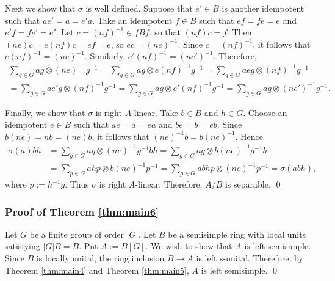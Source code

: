 \documentclass[12pt]{amsart}
\theoremstyle{definition}
\begin{document}
Next we show that $\sigma$ is well defined.
Suppose that $e' \in B$ is another idempotent such that $ae'=a=e'a$.
Take an idempotent $f \in B$ such that
$ef=fe=e$ and $e'f=fe'=e'$.
Let $c=(nf)^{-1}\in fBf$, so that
$(nf)c=f$. Then
$(ne)c=e(nf)c=ef=e$, so
$ec=(ne)^{-1}$.
Since $c=(nf)^{-1}$, it follows that
$e(nf)^{-1}=(ne)^{-1}$.
Similarly, $e'(nf)^{-1}=(ne')^{-1}$.
Therefore,
\[
\begin{array}{l}
\displaystyle
\sum_{g \in G} ag \otimes (ne)^{-1}g^{-1}
=
\sum_{g \in G} ag \otimes e(nf)^{-1}g^{-1}
=
\sum_{g \in G} aeg \otimes (nf)^{-1}g^{-1}
\\[10pt]
\displaystyle
=
\sum_{g \in G} ae'g \otimes (nf)^{-1}g^{-1}
=
\sum_{g \in G} ag \otimes e'(nf)^{-1}g^{-1}
=
\sum_{g \in G} ag \otimes (ne')^{-1}g^{-1}.
\end{array}
\]

Finally, we show that $\sigma$ is right $A$-linear.
Take $b \in B$ and $h \in G$.
Choose an idempotent $e \in B$ such that
$ae=a=ea$ and $be=b=eb$. Since
$b(ne)=nb=(ne)b$, it follows that
$(ne)^{-1}b=b(ne)^{-1}$. Hence
\[
\begin{aligned}
\sigma(a)bh
&=
\sum_{g\in G} ag \otimes (ne)^{-1}g^{-1}bh 
=
\sum_{g\in G} ag \otimes b(ne)^{-1}g^{-1}h \\
&=
\sum_{p\in G} ahp \otimes b(ne)^{-1}p^{-1} 
=
\sum_{p\in G} abhp \otimes (ne)^{-1}p^{-1} 
=
\sigma(abh),
\end{aligned}
\]
where $p := h^{-1}g$.
Thus $\sigma$ is right $A$-linear.
Therefore, $A/B$ is separable.
\qed

\subsubsection*{Proof of Theorem \ref{thm:main6}}
Let $G$ be a finite group 
of order $|G|$.
Let $B$ be a semisimple ring with local units 
satisfying $|G|B = B$. 
Put $A := B[G]$. We wish to show that $A$ is 
left semisimple.
Since $B$ is locally unital,
the ring inclusion $B \to A$
is left s-unital. Therefore, by Theorem
\ref{thm:main4} and Theorem \ref{thm:main5},
$A$ is left semisimple.
\qed 
\end{document}
